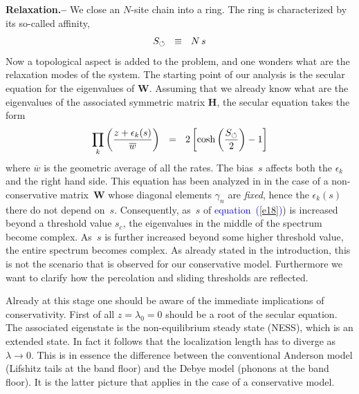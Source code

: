 \documentclass[aps,pre,floats,floatfix,twocolumn]{revtex4}
\newcommand{\be}[1]{\begin{eqnarray}\ifthenelse{#1=-1}{\nonumber}{\ifthenelse{#1=0}{}{\label{e#1}}}}
\newcommand{\eeq}{\end{eqnarray}}
\newcommand{\Eq}[1]{\textcolor{blue}{{equation}\!~(\ref{#1})}}
\newcommand{\sect}[1]{{\bf #1.-- }}
\begin{document}
\sect{Relaxation}
%
We close an $N$-site chain into a ring. 
The ring is characterized by its so-called affinity, 
%
\be{18}
S_{\circlearrowleft} \ \ \equiv \ \ N \, s
\eeq 
%
Now a topological aspect is added to the problem, 
and one wonders what are the relaxation modes of the system. 
%
The starting point of our analysis is the secular 
equation for the eigenvalues of $\bm{W}$.
Assuming that we already know what are the eigenvalues 
of the associated symmetric matrix $\bm{H}$,    
the secular equation takes the form \cite{det1} 
%
\be{20}
\prod_k \left(\frac{z+\epsilon_k(s)}{\overline{w}}\right) \ \ = \ \ 2\left[\cosh\left(\frac{S_{\circlearrowleft}}{2}\right)-1\right]
\eeq
%
where ${\overline{w}}$ is the geometric average of all the rates.
The bias~$s$ affects both the $\epsilon_k$ and the right hand side.
%
This equation has been analyzed in \cite{Shnerb1} 
in the case of a non-conservative matrix~$\bm{W}$ 
whose diagonal elements $\gamma_n$ are {\em fixed}, 
hence the $\epsilon_k(s)$ there do not depend on~$s$. 
Consequently, as~$s$ of \Eq{e18}) is increased beyond 
a threshold value $s_{c}$, the eigenvalues in the middle 
of the spectrum become complex. 
As~$s$ is further increased beyond some higher threshold value, 
the entire spectrum becomes complex. 
As already stated in the introduction, this is not the scenario 
that is observed for our conservative model.
Furthermore we want to clarify how the percolation 
and sliding thresholds are reflected.

Already at this stage one should be aware of the immediate 
implications of conservativity. First of all ${z=\lambda_0=0}$ 
should be a root of the secular equation. 
The associated eigenstate is the non-equilibrium steady state (NESS), 
which is an extended state. 
In fact it follows that the localization length has 
to diverge as ${\lambda\rightarrow0}$. 
This is in essence the difference between the 
conventional Anderson model (Lifshitz tails at the band floor) 
and the Debye model (phonons at the band floor). 
It is the latter picture that applies in the 
case of a conservative model.    
\end{document}
